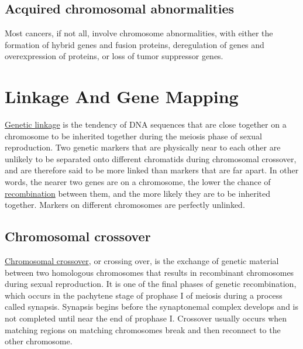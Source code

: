 \hypertarget{acquired-chromosomal-abnormalities}{%
\section{Acquired chromosomal abnormalities}\label{acquired-chromosomal-abnormalities}}

Most cancers, if not all, involve chromosome abnormalities, with either the formation of hybrid genes and fusion proteins, deregulation of genes and overexpression of proteins, or loss of tumor suppressor genes.

\hypertarget{linkage-and-gene-mapping}{%
\chapter{Linkage And Gene Mapping}\label{linkage-and-gene-mapping}}

\href{https://en.wikipedia.org/wiki/Genetic_linkage}{Genetic linkage} is the tendency of DNA sequences that are close together on a chromosome to be inherited together during the meiosis phase of sexual reproduction. Two genetic markers that are physically near to each other are unlikely to be separated onto different chromatids during chromosomal crossover, and are therefore said to be more linked than markers that are far apart. In other words, the nearer two genes are on a chromosome, the lower the chance of \href{https://en.wikipedia.org/wiki/Genetic_recombination}{recombination} between them, and the more likely they are to be inherited together. Markers on different chromosomes are perfectly unlinked.

\hypertarget{chromosomal-crossover}{%
\section{Chromosomal crossover}\label{chromosomal-crossover}}

\href{https://en.wikipedia.org/wiki/Chromosomal_crossover}{Chromosomal crossover}, or crossing over, is the exchange of genetic material between two homologous chromosomes that results in recombinant chromosomes during sexual reproduction. It is one of the final phases of genetic recombination, which occurs in the pachytene stage of prophase I of meiosis during a process called synapsis. Synapsis begins before the synaptonemal complex develops and is not completed until near the end of prophase I. Crossover usually occurs when matching regions on matching chromosomes break and then reconnect to the other chromosome.

